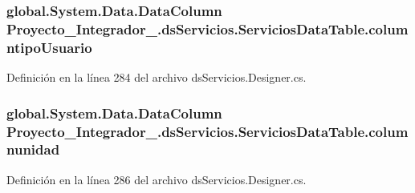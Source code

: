 \hypertarget{class_proyecto___integrador__3_1_1ds_servicios_1_1_servicios_data_table_ae6e9f606645938b441b38d9c7889971f}{
\subsubsection[{columntipo\-Usuario}]{\setlength{\rightskip}{0pt plus 5cm}global.\-System.\-Data.\-Data\-Column Proyecto\-\_\-\-Integrador\-\_.\-ds\-Servicios.\-Servicios\-Data\-Table.\-columntipo\-Usuario\hspace{0.3cm}{\ttfamily [private]}}}\label{class_proyecto___integrador__3_1_1ds_servicios_1_1_servicios_data_table_ae6e9f606645938b441b38d9c7889971f}


Definición en la línea 284 del archivo ds\-Servicios.\-Designer.\-cs.

\hypertarget{class_proyecto___integrador__3_1_1ds_servicios_1_1_servicios_data_table_a3b6ef8814cd3226485969d0a1e3900d3}{
\subsubsection[{columnunidad}]{\setlength{\rightskip}{0pt plus 5cm}global.\-System.\-Data.\-Data\-Column Proyecto\-\_\-\-Integrador\-\_.\-ds\-Servicios.\-Servicios\-Data\-Table.\-columnunidad\hspace{0.3cm}{\ttfamily [private]}}}\label{class_proyecto___integrador__3_1_1ds_servicios_1_1_servicios_data_table_a3b6ef8814cd3226485969d0a1e3900d3}


Definición en la línea 286 del archivo ds\-Servicios.\-Designer.\-cs.

